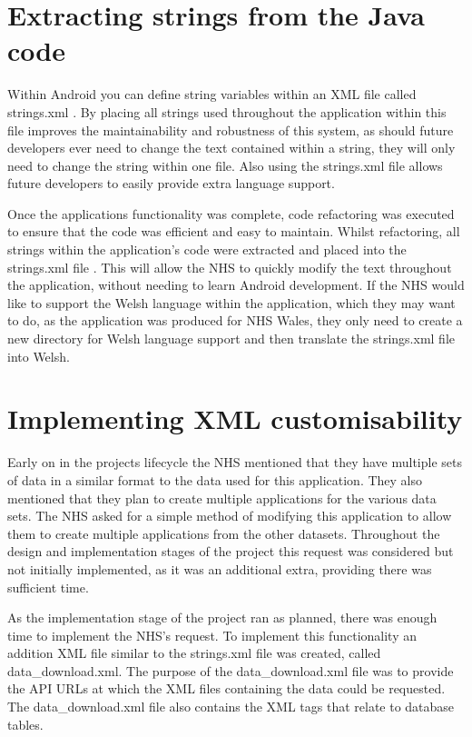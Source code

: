 \section{Extracting strings from the Java code}

Within Android you can define string variables within an XML file called strings.xml \cite{strings_xml}. By placing all strings used throughout the application within this file improves the maintainability and robustness of this system, as should future developers ever need to change the text contained within a string, they will only need to change the string within one file. Also using the strings.xml file allows future developers to easily provide extra language support\cite{strings_xml}.

Once the applications functionality was complete, code refactoring was executed to ensure that the code was efficient and easy to maintain. Whilst refactoring, all strings within the application's code were extracted and placed into the strings.xml file \cite{strings_xml}. This will allow the NHS to quickly modify the text throughout the application, without needing to learn Android development. If the NHS would like to support the Welsh language within the application, which they may want to do, as the application was produced for NHS Wales, they only need to create a new directory for Welsh language support and then translate the strings.xml file into Welsh.

\section{Implementing XML customisability}
Early on in the projects lifecycle the NHS mentioned that they have multiple sets of data in a similar format to the data used for this application. They also mentioned that they plan to create multiple applications for the various data sets. The NHS asked for a simple method of modifying this application to allow them to create multiple applications from the other datasets. Throughout the design and implementation stages of the project this request was considered but not initially implemented, as it was an additional extra, providing there was sufficient time.

As the implementation stage of the project ran as planned, there was enough time to implement the NHS's request. To implement this functionality an addition XML file similar to the strings.xml \cite{strings_xml} file was created, called data\_download.xml. The purpose of the data\_download.xml file was to provide the API URLs at which the XML files containing the data could be requested. The data\_download.xml file also contains the XML tags that relate to database tables.

